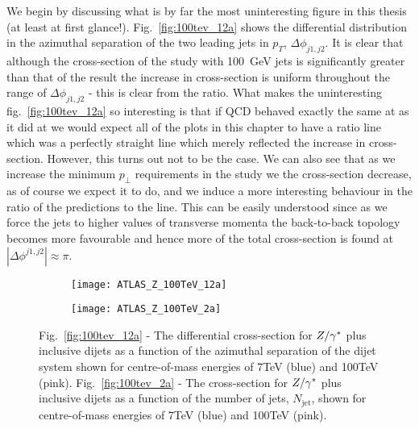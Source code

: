 	We begin by discussing what is by far the most uninteresting figure in this thesis (at least at first glance!).
	Fig.~\eqref{fig:100tev_12a} shows the differential distribution in the azimuthal separation of the
	two leading jets in $p_T$, $\Delta\phi_{j1, j2}$.  It is clear that although the cross-section of the \htev
	study with 100~GeV jets is significantly greater than that of the \stev result the increase in cross-section is uniform
	throughout the range of $\Delta\phi_{j1, j2}$ - this is clear from the ratio.  What makes the uninteresting
	fig.~\eqref{fig:100tev_12a} so interesting is that if QCD behaved exactly the same at \htev as it did at \stev
	we would expect all of the plots in this chapter to have a ratio line which was a perfectly straight line
	which merely reflected the increase in cross-section.  However, this turns out not to be the case.  We can also see
	that as we increase the minimum $p_\perp$ requirements in the \htev study we the cross-section decrease, as of course
	we expect it to do, and we induce a more interesting behaviour in the ratio of the predictions to the \stev line.
	This can be easily understood since as we force the jets to higher values of transverse momenta the back-to-back
	topology becomes more favourable and hence more of the total cross-section is found at $|\Delta\phi^{j1, j2}|\approx\pi$.

	\begin{figure}[bth]
		\centering
		\begin{subfigure}[b]{0.49\textwidth}
			\texttt{[image: ATLAS\_Z\_100TeV\_12a]}
			\caption{}
			\label{fig:100tev_12a}
		\end{subfigure}
		\begin{subfigure}[b]{0.49\textwidth}
			\texttt{[image: ATLAS\_Z\_100TeV\_2a]}
			\caption{}
			\label{fig:100tev_2a}
		\end{subfigure}
		\caption{Fig.~\eqref{fig:100tev_12a} - The differential cross-section for $Z/\gamma^*$ plus inclusive dijets as a
		function of the azimuthal separation of the dijet system shown for centre-of-mass energies of 7TeV (blue)
		and 100TeV (pink). Fig.~\eqref{fig:100tev_2a} - The cross-section for $Z/\gamma^*$ plus inclusive dijets as a
		function of the number of jets, $N_{\text{jet}}$, shown for centre-of-mass energies of 7TeV (blue) and
		100TeV (pink).}
	\end{figure}

